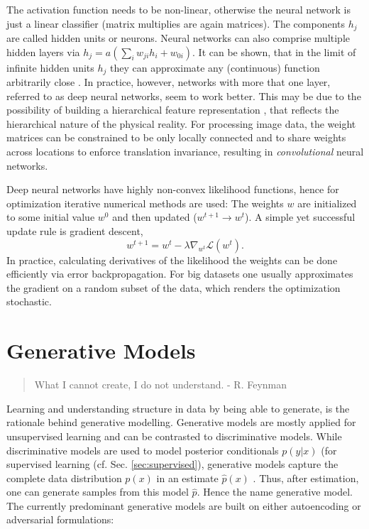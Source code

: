 		The activation function needs to be non-linear, otherwise the neural network is just a linear classifier (matrix multiplies are again matrices).
		The components $h_j$ are called hidden units or neurons. Neural networks can also comprise multiple hidden layers via $h_j  =  a (\sum_i w_{ji} h_i + w_{0i})$.
		It can be shown, that in the limit of infinite hidden units $h_j$ they can approximate any (continuous) function arbitrarily close \cite{cybenko89approx, hornik91approx}.
		In practice, however, networks with more that one layer, referred to as deep neural networks, seem to work better. This may be due to the possibility of building a hierarchical feature representation \cite{zeiler14vis}, that reflects the hierarchical nature of the physical reality. %
		For processing image data, the weight matrices can be constrained to be only locally connected and to share weights across locations to enforce translation invariance, resulting in \textit{convolutional} neural networks.

		Deep neural networks have highly non-convex likelihood functions, hence for optimization iterative numerical methods are used: The weights $w$ are initialized to some initial value $w^0$%
		and then updated ($w^{t+1}\rightarrow w^t$).
		A simple yet successful update rule is gradient descent,
		\begin{equation}
			w^{t+1} = w^{t} - \lambda \nabla_{w^t}	 \mathcal{L} (w^t).
		\end{equation}
		In practice, calculating derivatives of the likelihood \wrt the weights can be done efficiently via error backpropagation.
		For big datasets %
		one usually approximates the gradient on a random subset of the data, which renders the optimization stochastic.


\newpage
\section{Generative Models}\label{sec:genmodel}
	\begin{quote}
	    What I cannot create, I do not understand. - R. Feynman
	\end{quote}
	Learning and understanding structure in data by being able to generate, is the rationale behind generative modelling.
	Generative models are mostly applied for unsupervised learning and can be contrasted to discriminative models. While discriminative models are used to model posterior conditionals $p(y|x)$ (\eg for supervised learning (cf. Sec. \ref{sec:supervised}), generative models capture the complete data distribution $p(x)$ in an estimate $\hat p(x)$ \cite{bishop06pattern}. Thus, after estimation, one can generate samples from this model $\hat p$. Hence the name generative model.
	The currently predominant generative models are built on either autoencoding or adversarial formulations:

